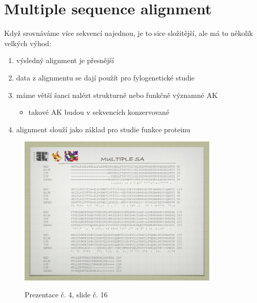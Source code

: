 \documentclass[DIV=8]{scrreprt}
\begin{document}
\section{Multiple sequence alignment} \label{Multiple sequence alignment}


Když srovnáváme více sekvencí najednou, je to sice složitější, ale má to několik velkých výhod:
\begin{enumerate}[nosep]
    \item výsledný alignment je přesnější
    \item data z alignmentu se dají použít pro fylogenetické studie
    \item máme větší šanci nalézt strukturně nebo funkčně významné AK
\begin{itemize}[nosep]
    \item takové AK budou v sekvencích konzervované
\end{itemize}

    \item alignment slouží jako základ pro studie funkce proteinu
\end{enumerate}



\begin{figure}
    \caption{Prezentace č. 4, slide č. 16}
    \includegraphics[width=0.85\textwidth]{slides-4/slide-16.jpg}
    \centering
    \label{slides-4-slide-16}
\end{figure}
\end{document}

